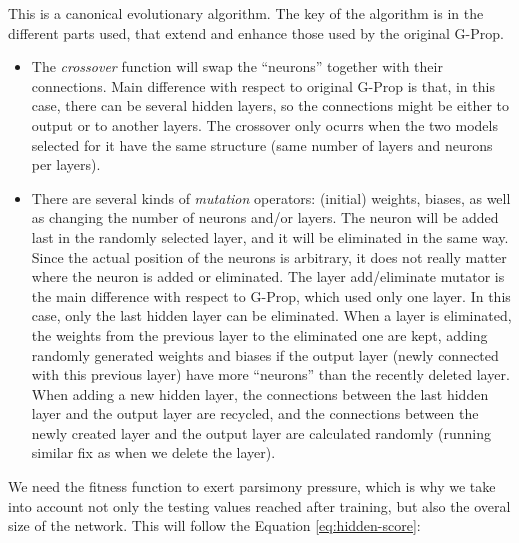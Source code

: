 \documentclass[runningheads]{llncs}
\begin{document}
This is a canonical evolutionary algorithm. The key of the algorithm is
in the different parts used, that extend and enhance those used by the
original G-Prop. \begin{itemize}


  \item The {\em crossover} function will swap the ``neurons'' together with
    their connections. Main difference with respect to original G-Prop is that,
    in this case, there can be several hidden layers, so the connections might
    be either to output or to another layers. The crossover only ocurrs when
    the two models selected for it have the same structure (same number of
    layers and neurons per layers).


  \item There are several kinds of {\em mutation} operators: (initial) weights,
    biases, as well as changing the number of neurons and/or
    layers. The neuron will be added last in the randomly selected layer, %
    and it will be eliminated in the same way. Since the actual position of the
    neurons is arbitrary, it does not really matter where the neuron %
    is added or eliminated. The layer add/eliminate mutator is the
    main difference with respect to G-Prop, which used only one
    layer. In this case, only the last hidden layer can be eliminated. When a
    layer is eliminated, the weights from the previous layer to the eliminated
    one are kept, adding randomly generated weights and biases if the output
    layer (newly connected with this previous layer) have more ``neurons'' than
    the recently deleted layer. When adding a new hidden layer, the connections
    between the last hidden layer and the output layer are recycled, and the
    connections between the newly created layer and the output layer are
    calculated randomly (running similar fix as when we delete the layer).

\end{itemize}

We need the fitness function to exert parsimony pressure, which is why
we take into account not only the testing values reached after
training, but also the overal size of the network. This will follow
the Equation \ref{eq:hidden-score}:
\end{document}
